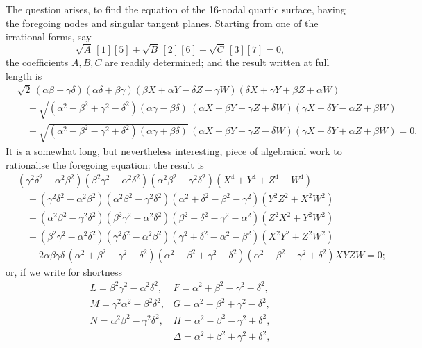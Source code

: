 \documentclass[11pt,a4paper]{article}
\begin{document}
The question arises, to find the equation of the 16-nodal quartic surface, having the foregoing nodes and singular tangent planes. Starting from one of the irrational forms, say
\[
\sqrt{A}\,[1][5] + \sqrt{B}\,[2][6] + \sqrt{C}\,[3][7] = 0,
\]
the coefficients $A, B, C$ are readily determined; and the result written at full length is
\[
\begin{aligned}
&\sqrt{2}\,(\alpha\beta - \gamma\delta)(\alpha\delta + \beta\gamma)(\beta X + \alpha Y - \delta Z - \gamma W)(\delta X + \gamma Y + \beta Z + \alpha W)\\
&\quad + \sqrt{(\alpha^{2} - \beta^{2} + \gamma^{2} - \delta^{2})(\alpha\gamma - \beta\delta)}\,(\alpha X - \beta Y - \gamma Z + \delta W)(\gamma X - \delta Y - \alpha Z + \beta W)\\
&\quad + \sqrt{(\alpha^{2} - \beta^{2} - \gamma^{2} + \delta^{2})(\alpha\gamma + \beta\delta)}\,(\alpha X + \beta Y - \gamma Z - \delta W)(\gamma X + \delta Y + \alpha Z + \beta W) = 0.
\end{aligned}
\]
It is a somewhat long, but nevertheless interesting, piece of algebraical work to rationalise the foregoing equation: the result is
\[
\begin{aligned}
&(\gamma^{2}\delta^{2} - \alpha^{2}\beta^{2})(\beta^{2}\gamma^{2} - \alpha^{2}\delta^{2})(\alpha^{2}\beta^{2} - \gamma^{2}\delta^{2})(X^{4} + Y^{4} + Z^{4} + W^{4})\\
&\quad + (\gamma^{2}\delta^{2} - \alpha^{2}\beta^{2})(\alpha^{2}\beta^{2} - \gamma^{2}\delta^{2})(\alpha^{2} + \delta^{2} - \beta^{2} - \gamma^{2})(Y^{2}Z^{2} + X^{2}W^{2})\\
&\quad + (\alpha^{2}\beta^{2} - \gamma^{2}\delta^{2})(\beta^{2}\gamma^{2} - \alpha^{2}\delta^{2})(\beta^{2} + \delta^{2} - \gamma^{2} - \alpha^{2})(Z^{2}X^{2} + Y^{2}W^{2})\\
&\quad + (\beta^{2}\gamma^{2} - \alpha^{2}\delta^{2})(\gamma^{2}\delta^{2} - \alpha^{2}\beta^{2})(\gamma^{2} + \delta^{2} - \alpha^{2} - \beta^{2})(X^{2}Y^{2} + Z^{2}W^{2})\\
&\quad + 2\alpha\beta\gamma\delta\,(\alpha^{2} + \beta^{2} - \gamma^{2} - \delta^{2})(\alpha^{2} - \beta^{2} + \gamma^{2} - \delta^{2})(\alpha^{2} - \beta^{2} - \gamma^{2} + \delta^{2})XYZW = 0;
\end{aligned}
\]
or, if we write for shortness
\[
\begin{array}{ll}
L = \beta^{2}\gamma^{2} - \alpha^{2}\delta^{2}, & F = \alpha^{2} + \beta^{2} - \gamma^{2} - \delta^{2},\\
M = \gamma^{2}\alpha^{2} - \beta^{2}\delta^{2}, & G = \alpha^{2} - \beta^{2} + \gamma^{2} - \delta^{2},\\
N = \alpha^{2}\beta^{2} - \gamma^{2}\delta^{2}, & H = \alpha^{2} - \beta^{2} - \gamma^{2} + \delta^{2},\\
& \Delta = \alpha^{2} + \beta^{2} + \gamma^{2} + \delta^{2},
\end{array}
\]
\end{document}
